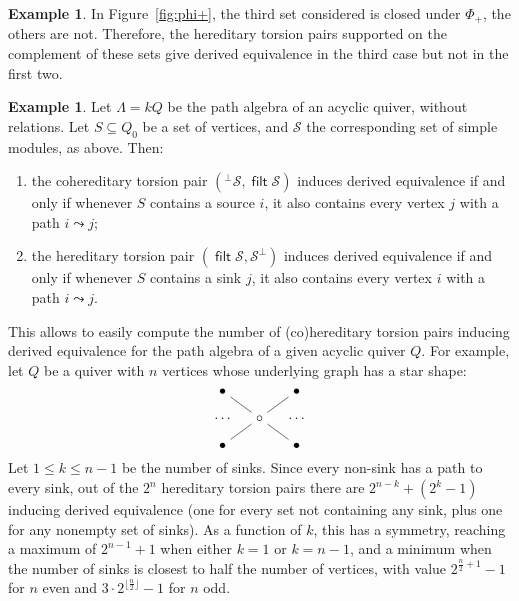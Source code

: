 \documentclass[a4paper,11pt]{amsart}
\theoremstyle{plain}
\theoremstyle{definition}
\newtheorem{ex}[thm]{Example}
\newcommand{\Scal}{\mathcal{S}} \newcommand{\Tcal}{\mathcal{T}} \newcommand{\Ucal}{\mathcal{U}}
\DeclareMathOperator{\filt}{\mathsf{filt}}
\begin{document}
\begin{ex}
	In Figure~\ref{fig:phi+}, the third set considered is closed under $\Phi_+$,
	the others are not. Therefore, the hereditary torsion pairs supported on the
	complement of these sets give derived equivalence in the third case but not in
	the first two.
\end{ex}

\begin{ex}
	Let $\Lambda=kQ$ be the path algebra of an acyclic quiver, without relations. Let $S\subseteq Q_0$ be
	a set of vertices, and $\Scal$ the corresponding set of simple modules, as
	above. Then:
	\begin{enumerate}
		\item the cohereditary torsion pair $({}^\bot\Scal,\filt\Scal)$ induces
			derived equivalence if and only if whenever $S$ contains a source $i$, it
			also contains every vertex $j$ with a path $i\leadsto j$;
		\item the hereditary torsion pair $(\filt\Scal,\Scal^\bot)$ induces
			derived equivalence if and only if whenever $S$ contains a sink $j$, it
			also contains every vertex $i$ with a path $i\leadsto j$.
	\end{enumerate}
	This allows to easily compute the number of (co)hereditary torsion pairs
	inducing derived equivalence for the path algebra of a given acyclic quiver
	$Q$. For example, let $Q$ be a quiver with $n$ vertices whose underlying
	graph has a star shape:
	\[\begin{tikzcd}[sep=small,cramped]
		\bullet \ar[-]{dr} && \bullet \\
		\cdots & \circ \ar[-]{ur} \ar[-]{dr} & \cdots \\
		\bullet \ar[-]{ur} && \bullet
	\end{tikzcd}\]
	Let $1\leq k\leq n-1$ be the number of sinks. Since every non-sink has a path
	to every sink, out of the $2^n$ hereditary torsion pairs there are
	$2^{n-k}+(2^k-1)$ inducing derived equivalence (one for every set not
	containing any sink, plus one for any nonempty set of sinks). As a function of
	$k$, this has a symmetry, reaching a maximum of $2^{n-1}+1$ when either $k=1$ or
	$k=n-1$, and a minimum when the number of sinks is closest to half the number of
	vertices, with value $2^{\frac{n}2+1}-1$ for $n$ even and
	$3\cdot2^{\lfloor\frac{n}2\rfloor}-1$ for $n$ odd.


\end{ex}
\end{document}
